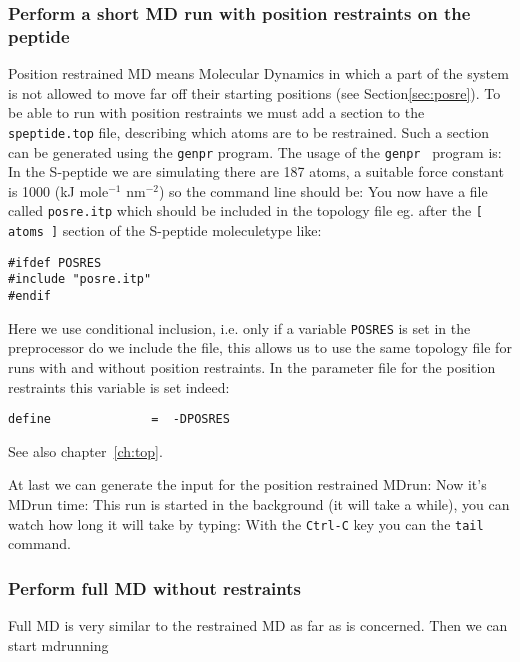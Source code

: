 \subsubsection{Perform a short MD run with position restraints on the peptide}
Position restrained MD means Molecular Dynamics in which a part of the
system is not allowed to move far off their starting positions (see
Section\ref{sec:posre}). To be able to run with position restraints we
must add a section to the {\tt speptide.top} file, describing which
atoms are to be restrained. Such a section can be generated using the
{\tt genpr} program. The usage of the {\tt genpr } program is: 
In the S-peptide we are simulating there are 187 atoms, a suitable
force constant is 1000 (kJ mole$^{-1}$ nm$^{-2}$) so the command
line should be: 
You now have a file called {\tt posre.itp} which should be included
in the topology file eg. after the {\tt [ atoms ]} section
of the S-peptide moleculetype like:
\begin{verbatim}
#ifdef POSRES
#include "posre.itp"
#endif
\end{verbatim}
Here we use conditional inclusion, i.e. only if a variable {\tt POSRES}
is set in the preprocessor do we include the file, this allows 
us to use the same topology file for runs with and without
position restraints. In the parameter file for the position restraints
this variable is set indeed:
\begin{verbatim}
define              =  -DPOSRES
\end{verbatim}
See also chapter~\ref{ch:top}.

At last we can generate the input for the position restrained MDrun:
Now it's MDrun time:
This run is started in the background (it will take a while), you
can watch how long it will take by typing:
With the {\tt Ctrl-C} key you can  the {\tt tail} command.

\subsubsection{Perform full MD without restraints}
Full MD is very similar to the restrained MD as far as {\gromacs} is
concerned.  
Then we can start mdrunning

